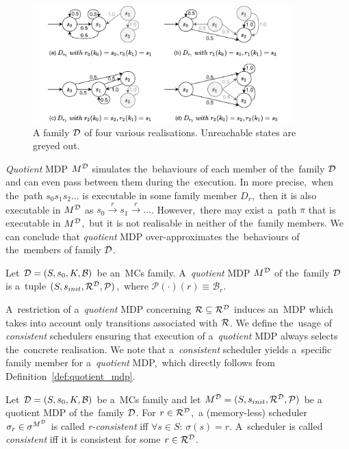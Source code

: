 \begin{figure}[ht!]
\centering
\includegraphics[width=0.9\textwidth]{figures/MCFamily.pdf}
\caption{A family $\mathcal{D}$ of four various realisations. Unreachable states are greyed out.}%
\label{fig:mcfamily}%
\end{figure}

\textit{Quotient} MDP $M^{\mathcal{D}}$ simulates the~behaviours of each member of the~family $\mathcal{D}$ and can even pass between them during the~execution.
In more precise,~when the~path $s_0s_1s_2 \dots$ is executable in some family member $D_r$,~then it is also executable in $M^{\mathcal{D}}$ as $s_0 \overset{r}{\rightarrow} s_1 \overset{r}{\rightarrow} \dots$.
However,~there may exist a~path $\pi$ that is executable in $M^{\mathcal{D}}$,~but it is not realisable in neither of the~family members.
We can conclude that \textit{quotient} MDP over-approximates the~behaviours of the~members of family $\mathcal{D}$.

\begin{definition} \label{def:quotient_mdp}
\cite{roman-DP}
Let $\mathcal{D} = (S,s_{0},K,\mathcal{B})$ be an~MCs family.
A~\textit{quotient} MDP $M^{\mathcal{D}}$ of the~family $\mathcal{D}$ is a~tuple $(S, s_{init}, \mathcal{R}^{\mathcal{D}}, \mathcal{P})$,~where $\mathcal{P}(\cdot)(r) \equiv \mathcal{B}_r$.
\end{definition}

A~restriction of a~\textit{quotient} MDP concerning $\mathcal{R} \subseteq \mathcal{R}^{\mathcal{D}}$ induces an~MDP which takes into account only transitions associated with $\mathcal{R}$.
We define the~usage of \textit{consistent} schedulers ensuring that execution of a~\textit{quotient} MDP always selects the~concrete realisation.
We note that a~\textit{consistent} scheduler yields a~specific family member for a~\textit{quotient} MDP,~which directly follows from Definition~\ref{def:quotient_mdp}.

\begin{definition}
\cite{roman-DP}
Let $\mathcal{D} = (S,s_{0},K,\mathcal{B})$ be a~MCs family and let $M^{\mathcal{D}} = (S, s_{init}, \mathcal{R}^{\mathcal{D}}, \mathcal{P})$ be a quotient MDP of the~family $\mathcal{D}$.
For $r \in \mathcal{R}^{\mathcal{D}}$,~a (memory-less) scheduler $\sigma_r \in \sigma^{M^{\mathcal{D}}}$ is called \textit{r-consistent} iff $\forall s \in S: \, \sigma(s) = r$.
A~scheduler is called \textit{consistent} iff it is consistent for some $r \in \mathcal{R}^{\mathcal{D}}$.
\end{definition}

